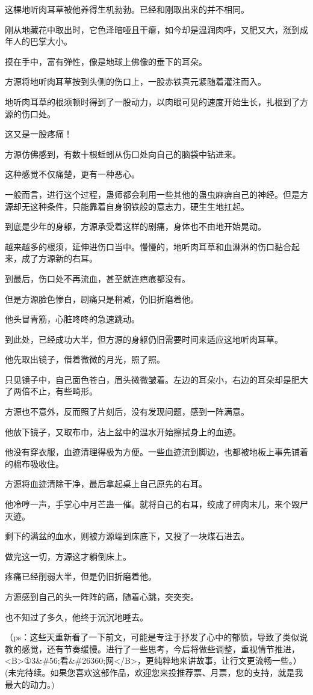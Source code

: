 \begin{this_body}
这棵地听肉耳草被他养得生机勃勃。已经和刚取出来的并不相同。

刚从地藏花中取出时，它色泽暗哑且干瘪，如今却是温润肉呼，又肥又大，涨到成年人的巴掌大小。

摸在手中，富有弹性，像是地球上佛像的垂下的耳朵。

方源将地听肉耳草按到头侧的伤口上，一股赤铁真元紧随着灌注而入。

地听肉耳草的根须顿时得到了一股动力，以肉眼可见的速度开始生长，扎根到了方源的伤口处。

这又是一股疼痛！

方源仿佛感到，有数十根蚯蚓从伤口处向自己的脑袋中钻进来。

这种感觉不仅痛楚，更有一种恶心。

一般而言，进行这个过程，蛊师都会利用一些其他的蛊虫麻痹自己的神经。但是方源却无这种条件，只能靠着自身钢铁般的意志力，硬生生地扛起。

到底是少年的身躯，方源承受着这样的剧痛，身体也不由地开始晃动。

越来越多的根须，延伸进伤口当中。慢慢的，地听肉耳草和血淋淋的伤口黏合起来，成了方源新的右耳。

到最后，伤口处不再流血，甚至就连疤痕都没有。

但是方源脸色惨白，剧痛只是稍减，仍旧折磨着他。

他头冒青筋，心脏咚咚的急速跳动。

到此处，已经成功大半，但方源的身躯仍旧需要时间来适应这地听肉耳草。

他先取出镜子，借着微微的月光，照了照。

只见镜子中，自己面色苍白，眉头微微皱着。左边的耳朵小，右边的耳朵却是肥大了两倍不止，有些畸形。

方源也不意外，反而照了片刻后，没有发现问题，感到一阵满意。

他放下镜子，又取布巾，沾上盆中的温水开始擦拭身上的血迹。

他没有穿衣服，血迹清理得极为方便。一些血迹流到脚边，也都被地板上事先铺着的棉布吸收住。

方源将血迹清除干净，最后拿起桌上自己原先的右耳。

他冷哼一声，手掌心中月芒蛊一催。就将自己的右耳，绞成了碎肉末儿，来个毁尸灭迹。

剩下的满盆的血水，则被方源端到床底下，又投了一块煤石进去。

做完这一切，方源这才躺倒床上。

疼痛已经削弱大半，但是仍旧折磨着他。

方源感到自己的头一阵阵的痛，随着心跳，突突突。

也不知过了多久，他终于沉沉地睡去。

（ps：这些天重新看了一下前文，可能是专注于抒发了心中的郁愤，导致了类似说教的感觉，还有节奏缓慢。进行了一些思考，今后将做些调整，重视情节推进，<B>①3\&\#56;看\&\#26360;网</B>，更纯粹地来讲故事，让行文更流畅一些。）(未完待续。如果您喜欢这部作品，欢迎您来投推荐票、月票，您的支持，就是我最大的动力。)

\end{this_body}

